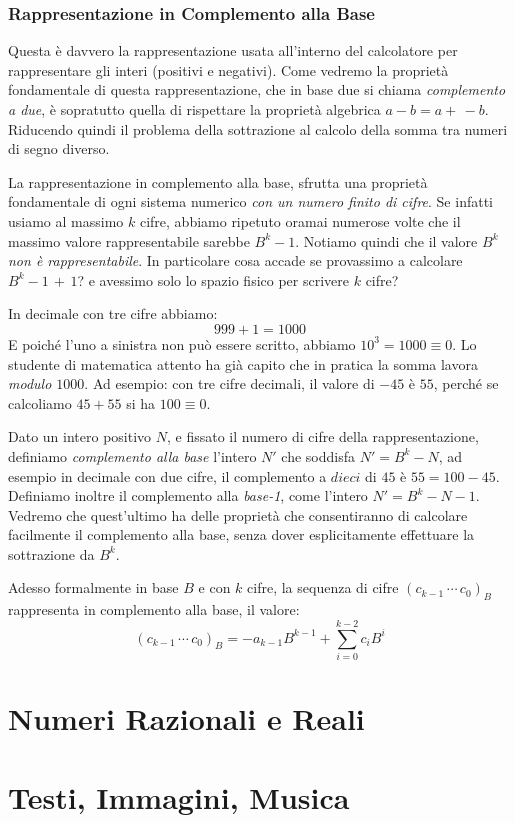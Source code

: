 \subsubsection{Rappresentazione in Complemento alla Base}

Questa è davvero la rappresentazione usata all'interno del calcolatore per
rappresentare gli interi (positivi e negativi). Come vedremo la proprietà
fondamentale di questa rappresentazione, che in base due si chiama \emph{complemento a due}, è sopratutto quella di rispettare la proprietà algebrica $a - b = a +\, -b$. Riducendo quindi il problema della sottrazione
al calcolo della somma tra numeri di segno diverso.

La rappresentazione in complemento alla base, sfrutta una proprietà fondamentale
di ogni sistema numerico \emph{con un numero finito di cifre}. Se infatti usiamo al massimo $k$ cifre, abbiamo ripetuto oramai numerose volte che il massimo valore rappresentabile sarebbe $B^k-1$. Notiamo quindi che il valore
$B^k$ \emph{non è rappresentabile}. In particolare cosa accade se provassimo a calcolare $B^k-1\,+\,1$? e avessimo solo lo spazio fisico per scrivere $k$ cifre?

\begin{ex} In decimale con tre cifre abbiamo:
	\[ \boxed{9}\boxed{9}\boxed{9} + 1 = 1\boxed{0}\boxed{0}\boxed{0} \]
E poiché l'uno a sinistra non può essere scritto, abbiamo $10^3 = 1000 \equiv 0$. Lo studente di matematica attento ha già capito che in pratica la somma lavora \emph{modulo $1000$}. Ad esempio: con tre cifre decimali, il valore di $-45$ è $55$, perché se calcoliamo $45 + 55$ si ha $100 \equiv 0$.
\end{ex}

Dato un intero positivo $N$, e fissato il numero di cifre della rappresentazione, definiamo \emph{complemento alla base} l'intero $N'$
che soddisfa $N'= B^k-N$, ad esempio in decimale con due cifre,
il complemento a $dieci$ di $45$ è $55 = 100-45$. Definiamo inoltre il complemento alla \emph{base-1}, come l'intero $N' = B^k-N-1$. Vedremo che
quest'ultimo ha delle proprietà che consentiranno di calcolare facilmente il complemento alla base, senza dover esplicitamente effettuare la sottrazione da $B^k$.

Adesso formalmente in base $B$ e con $k$ cifre, la sequenza di cifre $(c_{k-1}\,\cdots\,c_{0})_B$ rappresenta in complemento alla base, il valore:
\[ (c_{k-1}\,\cdots\,c_{0})_B = -a_{k-1}B^{k-1}+\sum_{i=0}^{k-2} c_iB^i \] 


\section{Numeri Razionali e Reali}

\section{Testi, Immagini, Musica}
